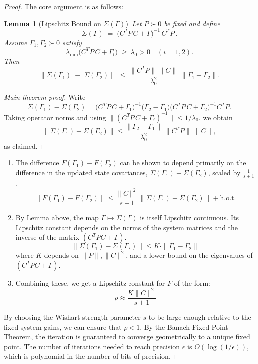 \documentclass[12pt]{article}
\theoremstyle{definition}
\theoremstyle{plain}
\newtheorem{lemma}{Lemma}[section]
\begin{document}
\begin{proof}[Proof]


The core argument is as follows:

\begin{lemma}[Lipschitz Bound on $\Sigma(\Gamma)$]
\label{lem:Sigma_lipschitz}
Let $P\succ 0$ be fixed and define
\[
\Sigma(\Gamma) \;=\; \bigl(C^T P\,C + \Gamma\bigr)^{-1} \,C^T P \,.
\]
Assume $\Gamma_1,\Gamma_2\succ0$ satisfy
\[
\lambda_{\min}\bigl(C^T P\,C + \Gamma_i\bigr)\;\ge\;\lambda_0>0
\quad(i=1,2).
\]
Then
\[
\|\Sigma(\Gamma_1)\;-\;\Sigma(\Gamma_2)\|
\;\le\;
\frac{\|C^T P\|\,\|C\|}{\lambda_0^2}\;
\|\Gamma_1-\Gamma_2\|.
\]
\end{lemma}

\begin{proof}[Main theorem proof]
Write
\[
\Sigma(\Gamma_1)-\Sigma(\Gamma_2)
=
\bigl(C^T P\,C+\Gamma_1\bigr)^{-1}
\bigl(\Gamma_2-\Gamma_1\bigr)
\bigl(C^T P\,C+\Gamma_2\bigr)^{-1}C^T P.
\]
Taking operator norms and using 
$\|(C^T P\,C+\Gamma_i)^{-1}\|\le1/\lambda_0$, we obtain
\[
\|\Sigma(\Gamma_1)-\Sigma(\Gamma_2)\|
\le
\frac{\|\Gamma_2-\Gamma_1\|}{\lambda_0^2}\,\|C^T P\|\;\|C\|,
\]
as claimed.
\end{proof}

\begin{enumerate}
    \item The difference $F(\Gamma_1) - F(\Gamma_2)$ can be shown to depend primarily on the difference in the updated state covariances, $\Sigma(\Gamma_1) - \Sigma(\Gamma_2)$, scaled by $\frac{1}{s+1}$.
    \[
    \|F(\Gamma_1)-F(\Gamma_2)\| \le \frac{\|C\|^2}{s+1} \|\Sigma(\Gamma_1)-\Sigma(\Gamma_2)\| + \text{h.o.t.}
    \]
    \item By Lemma above, the map $\Gamma \mapsto \Sigma(\Gamma)$ is itself Lipschitz continuous. Its Lipschitz constant depends on the norms of the system matrices and the inverse of the matrix $(C^T P C + \Gamma)$.
    \[
    \|\Sigma(\Gamma_1)-\Sigma(\Gamma_2)\| \le K \cdot \|\Gamma_1 - \Gamma_2\|
    \]
    where $K$ depends on $\|P\|, \|C\|^2$, and a lower bound on the eigenvalues of $(C^T P C + \Gamma)$.
    \item Combining these, we get a Lipschitz constant for $F$ of the form:
    \[
    \rho \approx \frac{K \|C\|^2}{s+1}
    \]
\end{enumerate}
By choosing the Wishart strength parameter $s$ to be large enough relative to the fixed system gains, we can ensure that $\rho < 1$. By the Banach Fixed-Point Theorem, the iteration is guaranteed to converge geometrically to a unique fixed point. The number of iterations needed to reach precision $\epsilon$ is $O(\log(1/\epsilon))$, which is polynomial in the number of bits of precision.
\end{proof}
\end{document}
